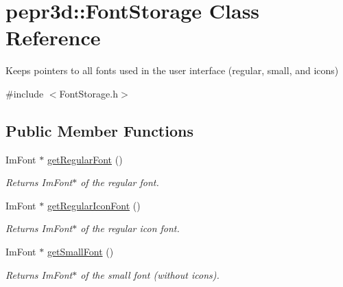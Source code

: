 \hypertarget{classpepr3d_1_1_font_storage}{}\section{pepr3d\+::Font\+Storage Class Reference}
\label{classpepr3d_1_1_font_storage}


Keeps pointers to all fonts used in the user interface (regular, small, and icons)  




{\ttfamily \#include $<$Font\+Storage.\+h$>$}

\subsection*{Public Member Functions}
\begin{DoxyCompactItemize}
\item 
\mbox{\label{classpepr3d_1_1_font_storage_ae5d2bf9987181c0de0935b0fde4eeffc}} 
Im\+Font $\ast$ \mbox{\hyperlink{classpepr3d_1_1_font_storage_ae5d2bf9987181c0de0935b0fde4eeffc}{get\+Regular\+Font}} ()
\begin{DoxyCompactList}\small\item\em Returns Im\+Font$\ast$ of the regular font. \end{DoxyCompactList}\item 
\mbox{\label{classpepr3d_1_1_font_storage_a6202a64a861a25046ec06224f1b20582}} 
Im\+Font $\ast$ \mbox{\hyperlink{classpepr3d_1_1_font_storage_a6202a64a861a25046ec06224f1b20582}{get\+Regular\+Icon\+Font}} ()
\begin{DoxyCompactList}\small\item\em Returns Im\+Font$\ast$ of the regular icon font. \end{DoxyCompactList}\item 
\mbox{\label{classpepr3d_1_1_font_storage_a4c5ce83b8b237fe4ebf7d8d359d5e522}} 
Im\+Font $\ast$ \mbox{\hyperlink{classpepr3d_1_1_font_storage_a4c5ce83b8b237fe4ebf7d8d359d5e522}{get\+Small\+Font}} ()
\begin{DoxyCompactList}\small\item\em Returns Im\+Font$\ast$ of the small font (without icons). \end{DoxyCompactList}\end{DoxyCompactItemize}

